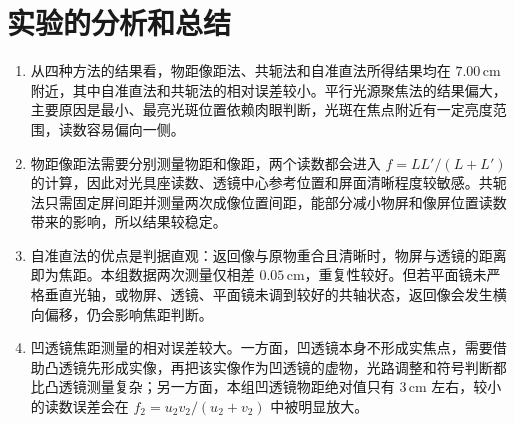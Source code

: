 \documentclass{../template/myrpt}
\begin{document}
\section{实验的分析和总结}

\begin{enumerate}[label=\arabic*. ]
  \item 从四种方法的结果看，物距像距法、共轭法和自准直法所得结果均在 $7.00\,\mathrm{cm}$ 附近，其中自准直法和共轭法的相对误差较小。平行光源聚焦法的结果偏大，主要原因是最小、最亮光斑位置依赖肉眼判断，光斑在焦点附近有一定亮度范围，读数容易偏向一侧。
  \item 物距像距法需要分别测量物距和像距，两个读数都会进入 $f=LL'/(L+L')$ 的计算，因此对光具座读数、透镜中心参考位置和屏面清晰程度较敏感。共轭法只需固定屏间距并测量两次成像位置间距，能部分减小物屏和像屏位置读数带来的影响，所以结果较稳定。
  \item 自准直法的优点是判据直观：返回像与原物重合且清晰时，物屏与透镜的距离即为焦距。本组数据两次测量仅相差 $0.05\,\mathrm{cm}$，重复性较好。但若平面镜未严格垂直光轴，或物屏、透镜、平面镜未调到较好的共轴状态，返回像会发生横向偏移，仍会影响焦距判断。
  \item 凹透镜焦距测量的相对误差较大。一方面，凹透镜本身不形成实焦点，需要借助凸透镜先形成实像，再把该实像作为凹透镜的虚物，光路调整和符号判断都比凸透镜测量复杂；另一方面，本组凹透镜物距绝对值只有 $3\,\mathrm{cm}$ 左右，较小的读数误差会在 $f_2=u_2v_2/(u_2+v_2)$ 中被明显放大。
\end{enumerate}

\insertSignedDataPage
\end{document}

